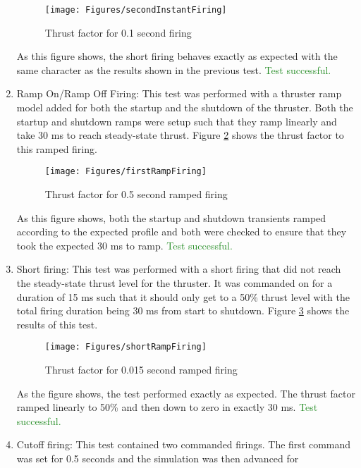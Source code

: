 \documentclass[]{BasiliskReportMemo}
\begin{document}
\begin{enumerate}
{    \begin{figure}[htb]
            \centerline{
            \texttt{[image: Figures/secondInstantFiring]}
            }
            \caption{Thrust factor for 0.1 second firing}
            \label{fig:second_inst_fir}
    \end{figure}
    As this figure shows, the short firing behaves exactly as expected with the 
    same character as the results shown in the previous test.
    \textcolor{ForestGreen}{Test successful.}
}
\item{Ramp On/Ramp Off Firing:  This test was performed with a thruster 
    ramp model added for both the startup and the shutdown of the thruster.  
    Both the startup and shutdown ramps were setup such that they ramp linearly 
    and take 30 ms to reach steady-state thrust.  Figure \ref{fig:first_ramp_fir} 
    shows the thrust factor to this ramped firing.
    \begin{figure}[htb]
            \centerline{
            \texttt{[image: Figures/firstRampFiring]}
            }
            \caption{Thrust factor for 0.5 second ramped firing}
            \label{fig:first_ramp_fir}
    \end{figure}
    As this figure shows, both the startup and shutdown transients ramped 
    according to the expected profile and both were checked to ensure that 
    they took the expected 30 ms to ramp. 
    \textcolor{ForestGreen}{Test successful.}
}
\item{Short firing:  This test was performed with a short firing that did not 
    reach the steady-state thrust level for the thruster.  It was commanded on 
    for a duration of 15 ms such that it should only get to a 50\% thrust level 
    with the total firing duration being 30 ms from start to shutdown.  Figure 
    \ref{fig:short_ramp_fir} shows the results of this test.
    \begin{figure}[htb]
            \centerline{
            \texttt{[image: Figures/shortRampFiring]}
            }
            \caption{Thrust factor for 0.015 second ramped firing}
            \label{fig:short_ramp_fir}
    \end{figure}
    As the figure shows, the test performed exactly as expected.  The thrust 
    factor ramped linearly to 50\% and then down to zero in exactly 30 ms.  
    	\textcolor{ForestGreen}{Test successful.}
}
\item{Cutoff firing:  This test contained two commanded firings.  The first 
    command was set for 0.5 seconds and the simulation was then advanced for 
}
\end{enumerate}
\end{document}
